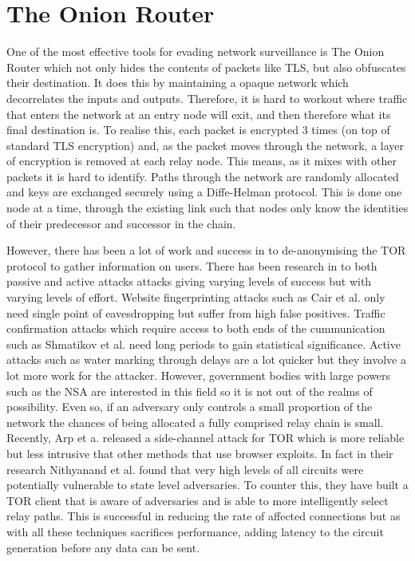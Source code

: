 \documentclass[12pt,a4paper]{article}
\begin{document}
\section{The Onion Router}

One of the most effective tools for evading network surveillance is The Onion Router which not only hides the contents of packets like TLS, but also obfuscates their destination. It does this by maintaining a opaque network which decorrelates the inputs and outputs. Therefore, it is hard to workout where traffic that enters the network at an entry node will exit, and then therefore what its final destination is. To realise this, each packet is encrypted 3 times (on top of standard TLS encryption) and, as the packet moves through the network, a layer of encryption is removed at each relay node. This means, as it mixes with other packets it is hard to identify. Paths through the network are randomly allocated and keys are exchanged securely using a Diffe-Helman protocol. This is done one node at a time, through the existing link such that nodes only know the identities of their predecessor and successor in the chain. 

However, there has been a lot of work and success in to de-anonymising the TOR protocol to gather information on users. There has been research in to both passive and active attacks attacks giving varying levels of success but with varying levels of effort.  Website fingerprinting attacks such as Cair et al.\cite{webfinger} only need single point of eavesdropping but suffer from high false positives. Traffic confirmation attacks which require access to both ends of the cummunication such as Shmatikov et al.\cite{conf} need long periods to gain statistical significance. Active attacks such as water marking through delays are a lot quicker but they involve a lot more work for the attacker. However, government bodies with large powers such as the NSA are interested in this field so it is not out of the realms of possibility. Even so, if an adversary only controls a small proportion of the network the chances of being allocated a fully comprised relay chain is small. Recently, Arp et a.\cite{torban} released a side-channel attack for TOR which is more reliable but less intrusive that other methods that use browser exploits. In fact in their research Nithyanand et al.\cite{AS} found that very high levels of all circuits were potentially vulnerable to state level adversaries. To counter this, they have built a TOR client that is aware of adversaries and is able to more intelligently select relay paths. This is successful in reducing the rate of affected connections but as with all these techniques sacrifices performance, adding latency to the circuit generation before any data can be sent.
\end{document}
